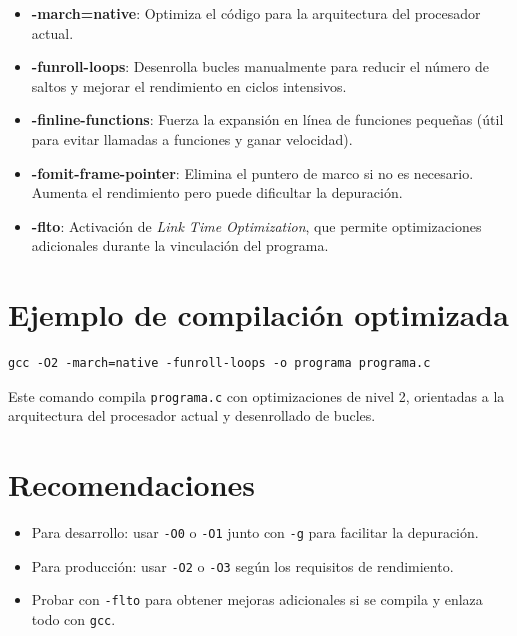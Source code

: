 \documentclass[12pt]{article}
\begin{document}
\begin{itemize}
  \item \textbf{-march=native}: Optimiza el código para la arquitectura del procesador actual.

  \item \textbf{-funroll-loops}: Desenrolla bucles manualmente para reducir el número de saltos y mejorar el rendimiento en ciclos intensivos.

  \item \textbf{-finline-functions}: Fuerza la expansión en línea de funciones pequeñas (útil para evitar llamadas a funciones y ganar velocidad).

  \item \textbf{-fomit-frame-pointer}: Elimina el puntero de marco si no es necesario. Aumenta el rendimiento pero puede dificultar la depuración.

  \item \textbf{-flto}: Activación de \textit{Link Time Optimization}, que permite optimizaciones adicionales durante la vinculación del programa.

\end{itemize}

\section*{Ejemplo de compilación optimizada}

\begin{lstlisting}
gcc -O2 -march=native -funroll-loops -o programa programa.c
\end{lstlisting}

Este comando compila \texttt{programa.c} con optimizaciones de nivel 2, orientadas a la arquitectura del procesador actual y desenrollado de bucles.

\section*{Recomendaciones}

\begin{itemize}
  \item Para desarrollo: usar \texttt{-O0} o \texttt{-O1} junto con \texttt{-g} para facilitar la depuración.
  \item Para producción: usar \texttt{-O2} o \texttt{-O3} según los requisitos de rendimiento.
  \item Probar con \texttt{-flto} para obtener mejoras adicionales si se compila y enlaza todo con \texttt{gcc}.
\end{itemize}
\end{document}
